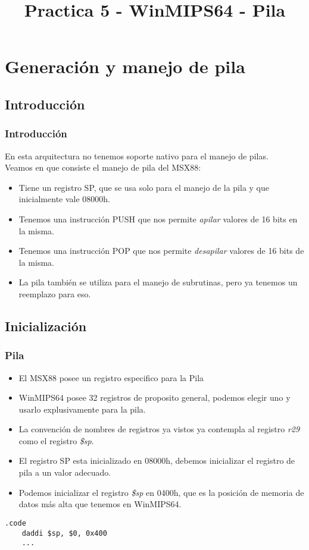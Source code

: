 \documentclass{beamer}
\title{Practica 5 - WinMIPS64 - Pila}
\begin{document}
\begin{frame}
\titlepage
\end{frame}

\section{Generación y manejo de pila}
\subsection{Introducción}
\begin{frame}
\frametitle{Introducción}
En esta arquitectura no tenemos soporte nativo para el manejo de pilas. \\
Veamos en que consiste el manejo de pila del MSX88:
\begin{itemize}
\item Tiene un registro SP, que se usa solo para el manejo de la pila y que inicialmente vale 08000h.
\item Tenemos una instrucción PUSH que nos permite \emph{apilar} valores de 16 bits en la misma.
\item Tenemos una instrucción POP que nos permite \emph{desapilar} valores de 16 bits de la misma.
\item La pila también se utiliza para el manejo de subrutinas, pero ya tenemos un reemplazo para eso.
\end{itemize}
\end{frame}

\subsection{Inicialización}
\begin{frame}[fragile]
\frametitle{Pila}
\begin{itemize}
\item El MSX88 posee un registro especifico para la Pila
\item WinMIPS64 posee 32 registros de proposito general, podemos elegir uno y usarlo explusivamente para la pila. 
\item La convención de nombres de registros ya vistos ya contempla al registro \emph{r29} como el registro \emph{\$sp}.
\item El registro SP esta inicializado en 08000h, debemos inicializar el registro de pila a un valor adecuado.
\item Podemos inicializar el registro \emph{\$sp} en 0400h, que es la posición de memoria de datos más alta que tenemos en WinMIPS64.
\end{itemize}

\begin{block}{}
\begin{lstlisting}[language=WinMIPS64,basicstyle=\ttfamily,keywordstyle=\color{blue}]
    .code
    daddi $sp, $0, 0x400
    ...
\end{lstlisting}
\end{block}

\end{frame}
\end{document}
